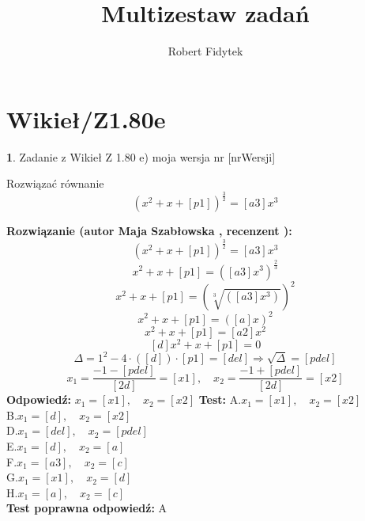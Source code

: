 \documentclass[12pt, a4paper]{article}
\title{Multizestaw zadań}
\author{Robert Fidytek}
\date{}
\theoremstyle{definition} %
\newtheorem{zad}{}
\newcommand{\kategoria}[1]{\section{#1}} %
\newcommand{\zadStart}[1]{\begin{zad}#1\newline} %
\newcommand{\zadStop}{\end{zad}}   %
\newcommand{\rozwStart}[2]{\noindent \textbf{Rozwiązanie (autor #1 , recenzent #2): }\newline} %
\newcommand{\rozwStop}{\newline}                                            %
\newcommand{\odpStart}{\noindent \textbf{Odpowiedź:}\newline}    %
\newcommand{\odpStop}{\newline}                                             %
\newcommand{\testStart}{\noindent \textbf{Test:}\newline} %
\newcommand{\testStop}{\newline} %
\newcommand{\kluczStart}{\noindent \textbf{Test poprawna odpowiedź:}\newline} %
\newcommand{\kluczStop}{\newline} %
\begin{document}
\maketitle


\kategoria{Wikieł/Z1.80e}
\zadStart{Zadanie z Wikieł Z 1.80 e)  moja wersja nr [nrWersji]}



Rozwiązać równanie 
$$(x^{2}+x+[p1])^{\frac{3}{2}}=[a3]x^{3}$$
\zadStop

\rozwStart{Maja Szabłowska}{}
$$(x^{2}+x+[p1])^{\frac{3}{2}}=[a3]x^{3}$$
$$x^{2}+x+[p1]=([a3]x^{3})^{\frac{2}{3}}$$
$$x^{2}+x+[p1]=\left(\sqrt[3]{([a3]x^{3})}\right)^{2}$$
$$x^{2}+x+[p1]=\left([a]x\right)^{2}$$
$$x^{2}+x+[p1]=[a2]x^{2}$$
$$[d]x^{2}+x+[p1]=0$$
$$\Delta=1^2 - 4\cdot([d])\cdot[p1]=[del]\Rightarrow \sqrt{\Delta}=[pdel]$$
$$x_{1}=\frac{-1-[pdel]}{[2d]}=[x1], \quad x_{2}=\frac{-1+[pdel]}{[2d]}=[x2]$$
\rozwStop
\odpStart
$x_{1}=[x1], \quad x_{2}=[x2]$
\odpStop
\testStart
A.$x_{1}=[x1], \quad x_{2}=[x2]$\\
B.$x_{1}=[d], \quad x_{2}=[x2]$\\
D.$x_{1}=[del], \quad x_{2}=[pdel]$\\
E.$x_{1}=[d], \quad x_{2}=[a]$\\
F.$x_{1}=[a3], \quad x_{2}=[c]$\\
G.$x_{1}=[x1], \quad x_{2}=[d]$\\
H.$x_{1}=[a], \quad x_{2}=[c]$\\
\testStop
\kluczStart
A
\kluczStop
\end{document}
